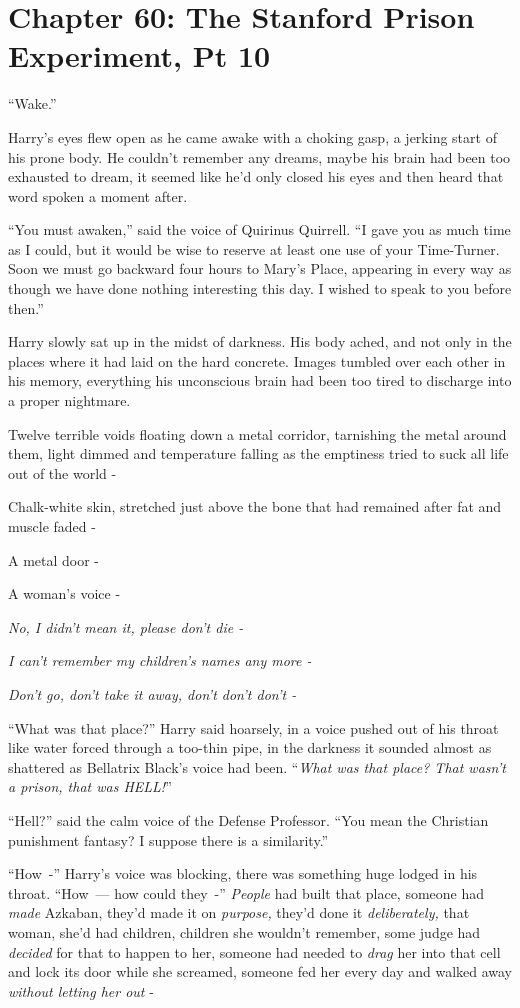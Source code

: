 \chapter{Chapter 60: The Stanford Prison Experiment, Pt 10}
``Wake.''

Harry's eyes flew open as he came awake with a choking gasp, a jerking start of his prone body. He couldn't remember any dreams, maybe his brain had been too exhausted to dream, it seemed like he'd only closed his eyes and then heard that word spoken a moment after.

``You must awaken,'' said the voice of Quirinus Quirrell. ``I gave you as much time as I could, but it would be wise to reserve at least one use of your Time-Turner. Soon we must go backward four hours to Mary's Place, appearing in every way as though we have done nothing interesting this day. I wished to speak to you before then.''

Harry slowly sat up in the midst of darkness. His body ached, and not only in the places where it had laid on the hard concrete. Images tumbled over each other in his memory, everything his unconscious brain had been too tired to discharge into a proper nightmare.

Twelve terrible voids floating down a metal corridor, tarnishing the metal around them, light dimmed and temperature falling as the emptiness tried to suck all life out of the world -

Chalk-white skin, stretched just above the bone that had remained after fat and muscle faded -

A metal door -

A woman's voice -

\emph{No, I didn't mean it, please don't die -}

\emph{I can't remember my children's names any more -}

\emph{Don't go, don't take it away, don't don't don't -}

``What was that place?'' Harry said hoarsely, in a voice pushed out of his throat like water forced through a too-thin pipe, in the darkness it sounded almost as shattered as Bellatrix Black's voice had been. ``\emph{What was that place? That wasn't a prison, that was HELL!}''

``Hell?'' said the calm voice of the Defense Professor. ``You mean the Christian punishment fantasy? I suppose there is a similarity.''

``How~-'' Harry's voice was blocking, there was something huge lodged in his throat. ``How~--- how could they~-'' \emph{People} had built that place, someone had \emph{made} Azkaban, they'd made it on \emph{purpose,} they'd done it \emph{deliberately,} that woman, she'd had children, children she wouldn't remember, some judge had \emph{decided} for that to happen to her, someone had needed to \emph{drag} her into that cell and lock its door while she screamed, someone fed her every day and walked away \emph{without letting her out} -

